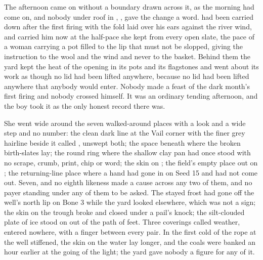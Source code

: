 The afternoon came on without a boundary drawn across it, as the morning had come on, and nobody under  roof in , ,  gave the change a word.  had been carried down after the first firing with the fold laid over his ears against the river wind, and  carried him now at the half-pace she kept from every open slate, the pace of a woman carrying a pot filled to the lip that must not be slopped, giving the instruction to the wool and the wind and never to the basket. Behind them the yard kept the heat of the opening in its pots and its flagstones and went about its work as though no lid had been lifted anywhere, because no lid had been lifted anywhere that anybody would enter. Nobody made a feast of the dark month's first firing and nobody crossed himself. It was an ordinary tending afternoon, and the boy took it as the only honest record there was.

She went wide around the seven walked-around places with a look and a wide step and no number: the clean dark line at the Vail corner with the finer grey hairline beside it called , unswept both; the space beneath  where the broken birth-slates lay; the round ring where the shallow clay pan had once stood with no scrape, crumb, print, chip or word; the skin on ; the field's empty place out on ; the returning-line place where a hand had gone in on Seed 15 and had not come out. Seven, and no eighth likeness made a cause across any two of them, and no payer standing under any of them to be asked. The stayed frost had gone off the well's north lip on Bone 3 while the yard looked elsewhere, which was not a sign; the skin on the trough broke and closed under a pail's knock; the silt-clouded plate of ice stood on  out of the path of feet. Three coverings called weather, entered nowhere, with a finger between every pair. In the first cold of  the rope at the well stiffened, the skin on the water lay longer, and the coals were banked an hour earlier at the going of the light; the yard gave nobody a figure for any of it.

